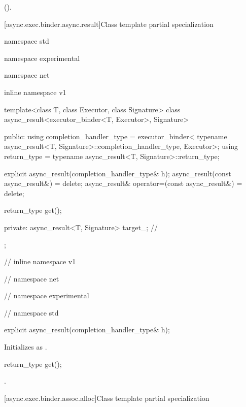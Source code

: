 \begin{itemdescr}
\pnum
\returns {} ().
\end{itemdescr}



[async.exec.binder.async.result]{Class template partial specialization }

%
%
\begin{codeblock}
namespace std {
namespace experimental {
namespace net {
inline namespace v1 {

  template<class T, class Executor, class Signature>
  class async_result<executor_binder<T, Executor>, Signature>
  {
  public:
    using completion_handler_type = executor_binder<
      typename async_result<T, Signature>::completion_handler_type,
        Executor>;
    using return_type = typename async_result<T, Signature>::return_type;

    explicit async_result(completion_handler_type& h);
    async_result(const async_result&) = delete;
    async_result& operator=(const async_result&) = delete;

    return_type get();

  private:
    async_result<T, Signature> target_; // \expos
  };

} // inline namespace v1
} // namespace net
} // namespace experimental
} // namespace std
\end{codeblock}

\begin{itemdecl}
explicit async_result(completion_handler_type& h);
\end{itemdecl}

\begin{itemdescr}
\pnum
\effects Initializes  as .
\end{itemdescr}

\begin{itemdecl}
return_type get();
\end{itemdecl}

\begin{itemdescr}
\pnum
\returns {}.
\end{itemdescr}



[async.exec.binder.assoc.alloc]{Class template partial specialization }

